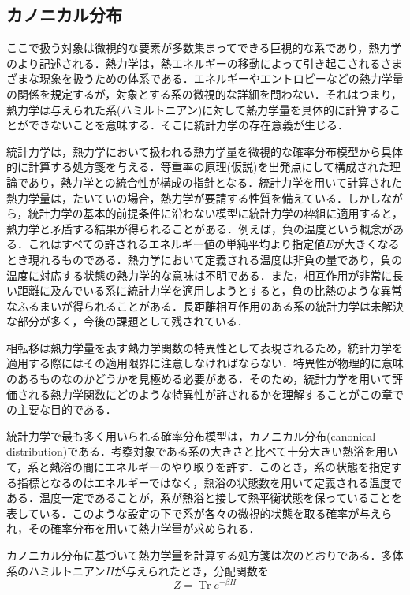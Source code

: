 \documentclass[a4paper,11pt]{jsarticle}
\begin{document}
\subsection{カノニカル分布}
ここで扱う対象は微視的な要素が多数集まってできる巨視的な系であり，熱力学のより記述される．熱力学は，熱エネルギーの移動によって引き起こされるさまざまな現象を扱うための体系である．エネルギーやエントロピーなどの熱力学量の関係を規定するが，対象とする系の微視的な詳細を問わない．それはつまり，熱力学は与えられた系(ハミルトニアン)に対して熱力学量を具体的に計算することができないことを意味する．そこに統計力学の存在意義が生じる．\par
統計力学は，熱力学において扱われる熱力学量を微視的な確率分布模型から具体的に計算する処方箋を与える．等重率の原理(仮説)を出発点にして構成された理論であり，熱力学との統合性が構成の指針となる．統計力学を用いて計算された熱力学量は，たいていの場合，熱力学が要請する性質を備えている．しかしながら，統計力学の基本的前提条件に沿わない模型に統計力学の枠組に適用すると，熱力学と矛盾する結果が得られることがある．例えば，負の温度という概念がある．これはすべての許されるエネルギー値の単純平均より指定値$E$が大きくなるとき現れるものである．熱力学において定義される温度は非負の量であり，負の温度に対応する状態の熱力学的な意味は不明である．また，相互作用が非常に長い距離に及んでいる系に統計力学を適用しようとすると，負の比熱のような異常なふるまいが得られることがある．長距離相互作用のある系の統計力学は未解決な部分が多く，今後の課題として残されている．\par
相転移は熱力学量を表す熱力学関数の特異性として表現されるため，統計力学を適用する際にはその適用限界に注意しなければならない．特異性が物理的に意味のあるものなのかどうかを見極める必要がある．そのため，統計力学を用いて評価される熱力学関数にどのような特異性が許されるかを理解することがこの章での主要な目的である．\par
統計力学で最も多く用いられる確率分布模型は，カノニカル分布(canonical distribution)である．考察対象である系の大きさと比べて十分大きい熱浴を用いて，系と熱浴の間にエネルギーのやり取りを許す．このとき，系の状態を指定する指標となるのはエネルギーではなく，熱浴の状態数を用いて定義される温度である．温度一定であることが，系が熱浴と接して熱平衡状態を保っていることを表している．このような設定の下で系が各々の微視的状態を取る確率が与えられ，その確率分布を用いて熱力学量が求められる．\par
カノニカル分布に基づいて熱力学量を計算する処方箋は次のとおりである．多体系のハミルトニアン$H$が与えられたとき，分配関数を
\begin{equation}
  Z = \operatorname{Tr}e^{-\beta H}
\end{equation}
\end{document}
